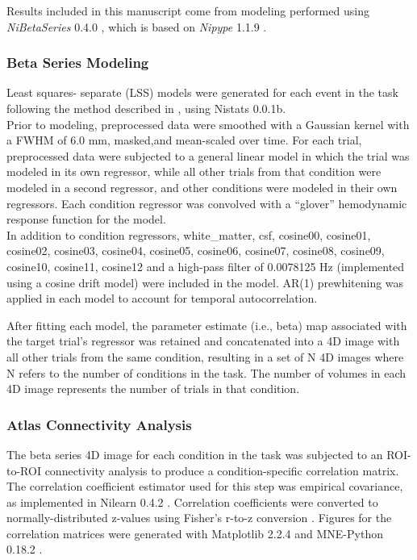 \documentclass[
]{article}
\date{}
\begin{document}
Results included in this manuscript come from modeling performed using
\emph{NiBetaSeries} 0.4.0 \citep{Kent2018}, which is based on
\emph{Nipype} 1.1.9 \citep{Gorgolewski2011, Gorgolewski2018}.

\hypertarget{beta-series-modeling}{%
\subsubsection{Beta Series Modeling}\label{beta-series-modeling}}

Least squares- separate (LSS) models were generated for each event in
the task following the method described in \citet{Turner2012a}, using
Nistats 0.0.1b.\\
Prior to modeling, preprocessed data were smoothed with a Gaussian
kernel with a FWHM of 6.0 mm, masked,and mean-scaled over time. For each
trial, preprocessed data were subjected to a general linear model in
which the trial was modeled in its own regressor, while all other trials
from that condition were modeled in a second regressor, and other
conditions were modeled in their own regressors. Each condition
regressor was convolved with a ``glover'' hemodynamic response function
for the model.\\
In addition to condition regressors, white\_matter, csf, cosine00,
cosine01, cosine02, cosine03, cosine04, cosine05, cosine06, cosine07,
cosine08, cosine09, cosine10, cosine11, cosine12 and a high-pass filter
of 0.0078125 Hz (implemented using a cosine drift model) were included
in the model. AR(1) prewhitening was applied in each model to account
for temporal autocorrelation.

After fitting each model, the parameter estimate (i.e., beta) map
associated with the target trial's regressor was retained and
concatenated into a 4D image with all other trials from the same
condition, resulting in a set of N 4D images where N refers to the
number of conditions in the task. The number of volumes in each 4D image
represents the number of trials in that condition.

\hypertarget{atlas-connectivity-analysis}{%
\subsubsection{Atlas Connectivity
Analysis}\label{atlas-connectivity-analysis}}

The beta series 4D image for each condition in the task was subjected to
an ROI-to-ROI connectivity analysis to produce a condition-specific
correlation matrix. The correlation coefficient estimator used for this
step was empirical covariance, as implemented in Nilearn 0.4.2
\citep{Abraham2014}. Correlation coefficients were converted to
normally-distributed z-values using Fisher's r-to-z conversion
\citep{Fisher1915}. Figures for the correlation matrices were generated
with Matplotlib 2.2.4 \citep{Hunter2007} and MNE-Python 0.18.2
\citep{Gramfort2013, Gramfort2014}.
\end{document}
